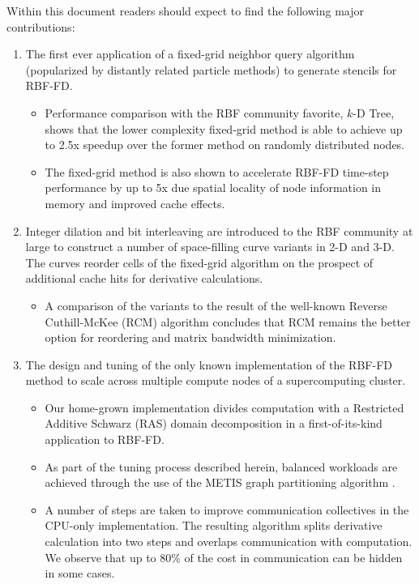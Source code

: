 Within this document readers should expect to find the following major contributions: 
\begin{enumerate} 
\item The first ever application of a fixed-grid neighbor query algorithm (popularized by distantly related particle methods) to generate stencils for RBF-FD. 
\begin{itemize} 
\item Performance comparison with the RBF community favorite, $k$-D Tree, shows that the lower complexity fixed-grid method is able to achieve up to 2.5x speedup over the former method on randomly distributed nodes. 
\item The fixed-grid method is also shown to accelerate RBF-FD time-step performance by up to 5x due spatial locality of node information in memory and improved cache effects.
\end{itemize} 
\item Integer dilation and bit interleaving are introduced to the RBF community at large to construct a number of space-filling curve variants in 2-D and 3-D. The curves reorder cells of the fixed-grid algorithm on the prospect of additional cache hits for derivative calculations. 
\begin{itemize} 
\item A comparison of the variants to the result of the well-known Reverse Cuthill-McKee (RCM) algorithm concludes that RCM remains the better option for reordering and matrix bandwidth minimization.
\end{itemize} 
\item The design and tuning of the only known implementation of the RBF-FD method to scale across multiple compute nodes of a supercomputing cluster.
\begin{itemize} 
\item Our home-grown implementation divides computation with a Restricted Additive Schwarz (RAS) domain decomposition in a first-of-its-kind application to RBF-FD. %
\item As part of the tuning process described herein, balanced workloads are achieved through the use of the METIS graph partitioning algorithm \cite{Karypis1999}.  
\item A number of steps are taken to improve communication collectives in the CPU-only implementation. The resulting algorithm splits derivative calculation into two steps and overlaps communication with computation. We observe that up to 80\% of the cost in communication can be hidden in some cases. 

\end{itemize}
\end{enumerate}
